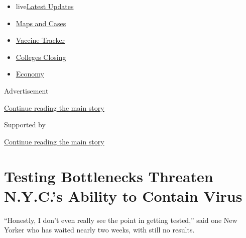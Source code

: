 \begin{itemize}
\tightlist
\item
  live\href{https://www.nytimes3xbfgragh.onion/2020/08/20/world/coronavirus-covid.html?name=styln-coronavirus-national\&region=TOP_BANNER\&variant=undefined\&block=storyline_menu_recirc\&action=click\&pgtype=Article\&impression_id=52705dc1-e386-11ea-9429-99c7ddc8e385}{Latest
  Updates}
\item
  \href{https://www.nytimes3xbfgragh.onion/interactive/2020/us/coronavirus-us-cases.html?name=styln-coronavirus-national\&region=TOP_BANNER\&variant=undefined\&block=storyline_menu_recirc\&action=click\&pgtype=Article\&impression_id=52705dc2-e386-11ea-9429-99c7ddc8e385}{Maps
  and Cases}
\item
  \href{https://www.nytimes3xbfgragh.onion/interactive/2020/science/coronavirus-vaccine-tracker.html?name=styln-coronavirus-national\&region=TOP_BANNER\&variant=undefined\&block=storyline_menu_recirc\&action=click\&pgtype=Article\&impression_id=527084d0-e386-11ea-9429-99c7ddc8e385}{Vaccine
  Tracker}
\item
  \href{https://www.nytimes3xbfgragh.onion/2020/08/19/us/colleges-closing-covid.html?name=styln-coronavirus-national\&region=TOP_BANNER\&variant=undefined\&block=storyline_menu_recirc\&action=click\&pgtype=Article\&impression_id=527084d1-e386-11ea-9429-99c7ddc8e385}{Colleges
  Closing}
\item
  \href{https://www.nytimes3xbfgragh.onion/live/2020/08/20/business/stock-market-today-coronavirus?name=styln-coronavirus-national\&region=TOP_BANNER\&variant=undefined\&block=storyline_menu_recirc\&action=click\&pgtype=Article\&impression_id=527084d2-e386-11ea-9429-99c7ddc8e385}{Economy}
\end{itemize}

Advertisement

\protect\hyperlink{after-top}{Continue reading the main story}

Supported by

\protect\hyperlink{after-sponsor}{Continue reading the main story}

\hypertarget{testing-bottlenecks-threaten-nycs-ability-to-contain-virus}{%
\section{Testing Bottlenecks Threaten N.Y.C.'s Ability to Contain
Virus}\label{testing-bottlenecks-threaten-nycs-ability-to-contain-virus}}

``Honestly, I don't even really see the point in getting tested,'' said
one New Yorker who has waited nearly two weeks, with still no results.

